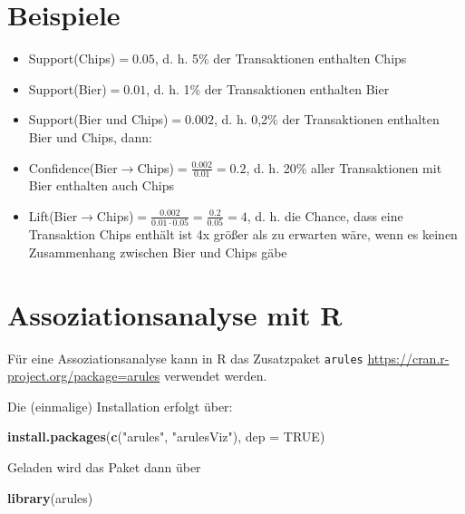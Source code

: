 \documentclass[12pt,]{book}
\newenvironment{Shaded}{\begin{snugshade}}{\end{snugshade}}
\newcommand{\KeywordTok}[1]{\textcolor[rgb]{0.13,0.29,0.53}{\textbf{{#1}}}}
\newcommand{\DataTypeTok}[1]{\textcolor[rgb]{0.13,0.29,0.53}{{#1}}}
\newcommand{\StringTok}[1]{\textcolor[rgb]{0.31,0.60,0.02}{{#1}}}
\newcommand{\OtherTok}[1]{\textcolor[rgb]{0.56,0.35,0.01}{{#1}}}
\newcommand{\NormalTok}[1]{{#1}}
\providecommand{\tightlist}{%
  \setlength{\itemsep}{0pt}\setlength{\parskip}{0pt}}
\begin{document}
\section{Beispiele}\label{beispiele}

\begin{itemize}
\tightlist
\item
  Support(Chips)\(=0.05\), d. h. 5\% der Transaktionen enthalten Chips
\item
  Support(Bier)\(=0.01\), d. h. 1\% der Transaktionen enthalten Bier
\item
  Support(Bier und Chips)\(=0.002\), d. h. 0,2\% der Transaktionen
  enthalten Bier und Chips, dann:
\item
  Confidence(Bier\(\rightarrow\)Chips)\(=\frac{0.002}{0.01}=0.2\), d. h.
  20\% aller Transaktionen mit Bier enthalten auch Chips
\item
  Lift(Bier\(\rightarrow\)Chips)\(=\frac{0.002}{0.01\cdot 0.05}=\frac{0.2}{0.05}=4\),
  d. h. die Chance, dass eine Transaktion Chips enthält ist 4x größer
  als zu erwarten wäre, wenn es keinen Zusammenhang zwischen Bier und
  Chips gäbe
\end{itemize}

\section{Assoziationsanalyse mit R}\label{assoziationsanalyse-mit-r}

Für eine Assoziationsanalyse kann in R das Zusatzpaket \texttt{arules}
\url{https://cran.r-project.org/package=arules} verwendet werden.

Die (einmalige) Installation erfolgt über:

\begin{Shaded}
\begin{Highlighting}[]
\KeywordTok{install.packages}\NormalTok{(}\KeywordTok{c}\NormalTok{(}\StringTok{"arules"}\NormalTok{, }\StringTok{"arulesViz"}\NormalTok{), }\DataTypeTok{dep =} \OtherTok{TRUE}\NormalTok{)}
\end{Highlighting}
\end{Shaded}

Geladen wird das Paket dann über

\begin{Shaded}
\begin{Highlighting}[]
\KeywordTok{library}\NormalTok{(arules)}
\end{Highlighting}
\end{Shaded}
\end{document}
